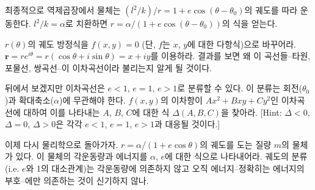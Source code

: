 최종적으로 역제곱장에서 물체는 $(l^2/k)/r=1+e\cos(\theta-\theta_0)$의 궤도를 따라 운동한다. $l^2/k=\alpha$로 치환하면 $r=\alpha/(1+e\cos(\theta-\theta_0))$의 식을 얻는다.
\begin{exercise}
    $r(\theta)$의 궤도 방정식을 $f(x,y)=0$ (단, $f$는 $x$, $y$에 대한 다항식)으로 바꾸어라. $\textbf{r}=re^{i\theta}=r(\cos\theta+i\sin\theta)=x+iy$를 이용하라. 결과를 보면 왜 이 곡선들--타원, 포물선, 쌍곡선--이 이차곡선이라 불리는지 알게 될 것이다.
\end{exercise}
\begin{exercise}
    뒤에서 보겠지만 이차곡선은 $e<1$, $e=1$, $e>1$로 분류할 수 있다. 이 분류는 회전($\theta_0$)과 확대축소($\alpha$)에 무관해야 한다. $f(x,y)$의 이차항이 $Ax^2+Bxy+Cy^2$인 이차곡선에 대하여 이를 나타내는 $A$, $B$, $C$에 대한 식 $\Delta(A, B, C)$을 찾아라. [Hint: $\Delta<0$, $\Delta=0$, $\Delta>0$은 각각 $e<1$, $e=1$, $e>1$과 대응될 것이다.] 
\end{exercise}
\begin{exercise}
    이제 다시 물리학으로 돌아가자. $r=\alpha/(1+e\cos\theta)$의 궤도를 도는 질량 $m$의 물체가 있다. 이 물체의 각운동량과 에너지를 $\alpha$, $e$에 대한 식으로 나타내어라. 궤도의 분류(i.e. $e$와 1의 대소관계)는 각운동량에 의존하지 않고 오직 에너지--정확히는 에너지의 부호--에만 의존하는 것이 신기하지 않나. 
\end{exercise}

